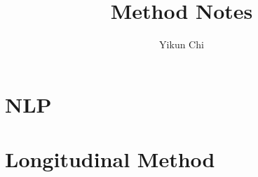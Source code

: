 \documentclass{book}
\title{Method Notes}
\author{Yikun Chi}
\begin{document}
\maketitle
\tableofcontents 


\part{NLP}



\part{Longitudinal Method}

\end{document}
